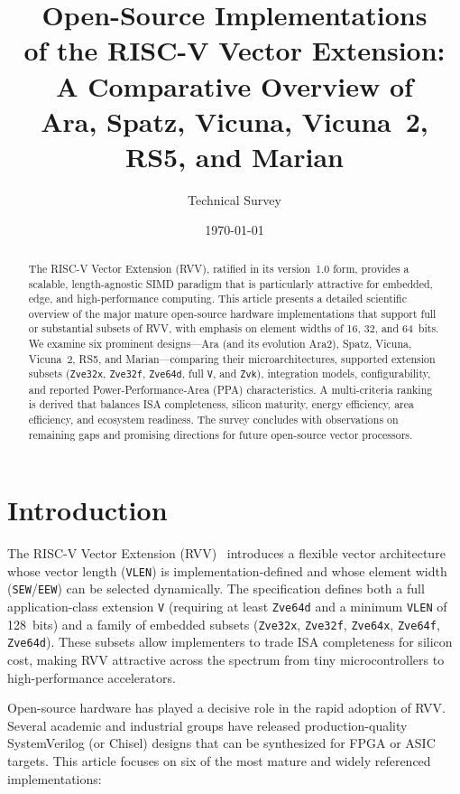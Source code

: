 \documentclass[11pt,a4paper]{article}
\title{\textbf{Open-Source Implementations \\of the RISC-V Vector Extension:\\
A Comparative Overview of \\ Ara, Spatz, Vicuna, Vicuna~2, RS5, and Marian}}
\author{Technical Survey}
\date{\today}
\begin{document}
\maketitle

\begin{abstract}
The RISC-V Vector Extension (RVV), ratified in its version~1.0 form, provides a scalable, length-agnostic SIMD paradigm that is particularly attractive for embedded, edge, and high-performance computing. This article presents a detailed scientific overview of the major mature open-source hardware implementations that support full or substantial subsets of RVV, with emphasis on element widths of 16, 32, and 64~bits. We examine six prominent designs---Ara (and its evolution Ara2), Spatz, Vicuna, Vicuna~2, RS5, and Marian---comparing their microarchitectures, supported extension subsets (\texttt{Zve32x}, \texttt{Zve32f}, \texttt{Zve64d}, full \texttt{V}, and \texttt{Zvk}), integration models, configurability, and reported Power-Performance-Area (PPA) characteristics. A multi-criteria ranking is derived that balances ISA completeness, silicon maturity, energy efficiency, area efficiency, and ecosystem readiness. The survey concludes with observations on remaining gaps and promising directions for future open-source vector processors.
\end{abstract}

\tableofcontents
\newpage

\section{Introduction}

The RISC-V Vector Extension (RVV)~\cite{riscv-v-spec} introduces a flexible vector architecture whose vector length (\texttt{VLEN}) is implementation-defined and whose element width (\texttt{SEW}/\texttt{EEW}) can be selected dynamically. The specification defines both a full application-class extension \texttt{V} (requiring at least \texttt{Zve64d} and a minimum \texttt{VLEN} of 128~bits) and a family of embedded subsets (\texttt{Zve32x}, \texttt{Zve32f}, \texttt{Zve64x}, \texttt{Zve64f}, \texttt{Zve64d}). These subsets allow implementers to trade ISA completeness for silicon cost, making RVV attractive across the spectrum from tiny microcontrollers to high-performance accelerators.

Open-source hardware has played a decisive role in the rapid adoption of RVV. Several academic and industrial groups have released production-quality SystemVerilog (or Chisel) designs that can be synthesized for FPGA or ASIC targets. This article focuses on six of the most mature and widely referenced implementations:
\end{document}
